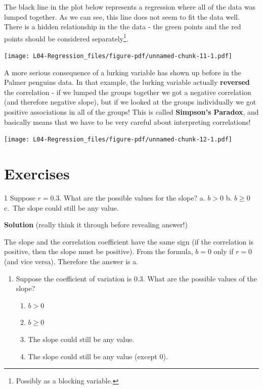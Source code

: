 \documentclass[
  letterpaper,
  DIV=11,
  numbers=noendperiod,
  oneside]{scrreprt}
\providecommand{\tightlist}{%
  \setlength{\itemsep}{0pt}\setlength{\parskip}{0pt}}\usepackage{longtable,booktabs,array}
\begin{document}
The black line in the plot below represents a regression where all of
the data was lumped together. As we can see, this line does not seem to
fit the data well. There is a hidden relationship in the the data - the
green points and the red points should be considered
separately\footnote{Possibly as a blocking variable.}.

\texttt{[image: L04-Regression\_files/figure-pdf/unnamed-chunk-11-1.pdf]}

A more serious consequence of a lurking variable has shown up before in
the Palmer penguins data. In that example, the lurking variable actually
\textbf{reversed} the correlation - if we lumped the groups together we
got a negative correlation (and therefore negative slope), but if we
looked at the groups individually we got positive associations in all of
the groups! This is called \textbf{Simpson's Paradox}, and basically
means that we have to be very careful about interpreting correlations!

\texttt{[image: L04-Regression\_files/figure-pdf/unnamed-chunk-12-1.pdf]}

\hypertarget{exercises-1}{%
\chapter{Exercises}\label{exercises-1}}

1 Suppose \(r = 0.3\). What are the possible values for the slope? a.
\(b > 0\) b. \(b \ge 0\) c.~The slope could still be any value.

\textbf{Solution} (really think it through before revealing answer!)

The slope and the correlation coefficient have the same sign (if the
correlation is positive, then the slope must be positive). From the
formula, \(b=0\) only if \(r = 0\) (and vice versa). Therefore the
answer is a.

\begin{enumerate}
\def\labelenumi{\arabic{enumi}.}
\setcounter{enumi}{1}
\tightlist
\item
  Suppose the coefficient of variation is 0.3. What are the possible
  values of the slope?

  \begin{enumerate}
  \def\labelenumii{\alph{enumii}.}
  \tightlist
  \item
    \(b > 0\)
  \item
    \(b \ge 0\)
  \item
    The slope could still be any value.
  \item
    The slope could still be any value (except 0).
  \end{enumerate}
\end{enumerate}
\end{document}
